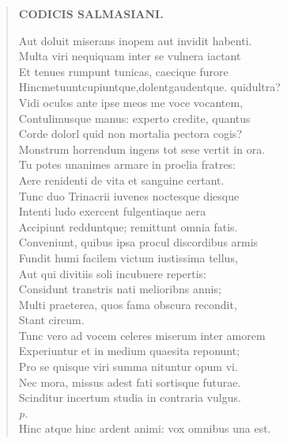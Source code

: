 \documentclass[11pt, a4paper]{report}
\begin{document}
\begin{verse}
    \begin{center} \textbf{CODICIS SALMASIANI.} \end{center} \marginpar{[35]} Aut doluit miserans inopem aut invidit habenti. \\ Multa viri nequiquam inter se vulnera iactant \\ Et tenues rumpunt tunicas, caecique furore \\ Hincmetuuntcupiuntque,dolentgaudentque. \lbrack quidultra? \\ Vidi oculos ante ipse meos me voce vocantem, \\ Contulimusque manus:  \lbrack experto \rbrack  credite, quantus \\ Corde dolorl quid non mortalia pectora cogis? \\ Monstrum horrendum ingens  \lbrack tot \rbrack  sese vertit in ora. \\ Tu potes unanimes armare in proelia fratres: \\ Aere renidenti de vita et sanguine certant. \\ Tunc duo Trinacrii iuvenes noctesque diesque \\ Intenti ludo exercent fulgentiaque aera \\ Accipiunt redduntque; remittunt omnia fatis. \\ Conveniunt, quibus ipsa procul discordibus armis \\ Fundit humi facilem victum iustissima tellus, \\ Aut qui divitiis soli incubuere repertis: \\ Considunt transtris nati melioribns annis; \\ Multi praeterea, quos fama obscura recondit, \\ Stant circum. \\ Tunc vero ad vocem celeres miserum inter amorem \\  \lbrack Experiuntur \rbrack  et in medium quaesita reponunt; \\ Pro se quisque viri summa nituntur opum vi. \\ Nec mora, missus adest fati sortisque futurae. \\ Scinditur incertum studia in contraria vulgus. \\ \textit{p.} \\ Hinc atque hinc ardent animi: vox omnibus una est. \\ 
      \end{verse}
  
\end{document}
